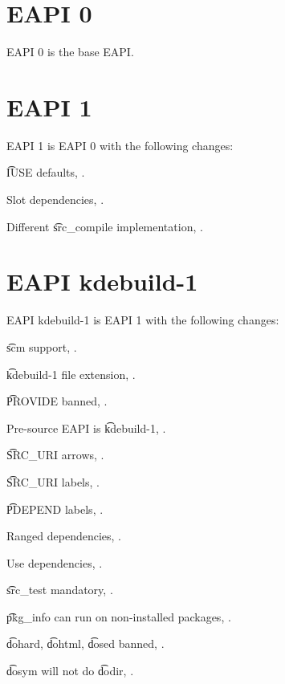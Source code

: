 \section*{EAPI 0}

EAPI 0 is the base EAPI.

\section*{EAPI 1}

EAPI 1 is EAPI 0 with the following changes:

\begin{compactitem}
\item \t{IUSE} defaults, .
\item Slot dependencies, .
\item Different \t{src\_compile} implementation, .
\end{compactitem}

\IFKDEBUILDELSE
{
    \section*{EAPI kdebuild-1}

    EAPI kdebuild-1 is EAPI 1 with the following changes:

    \begin{compactitem}
    \item \t{scm} support, .
    \item \t{kdebuild-1} file extension, .
    \item \t{PROVIDE} banned, .
    \item Pre-source EAPI is \t{kdebuild-1}, .
    \item \t{SRC\_URI} arrows, .
    \item \t{SRC\_URI} labels, .
    \item \t{PDEPEND} labels, .
    \item Ranged dependencies, .
    \item Use dependencies, .
    \item \t{src\_test} mandatory, .
    \item \t{pkg\_info} can run on non-installed packages, .
    \item \t{dohard}, \t{dohtml}, \t{dosed} banned, .
    \item \t{dosym} will not do \t{dodir}, .
    \end{compactitem}
}{
}

